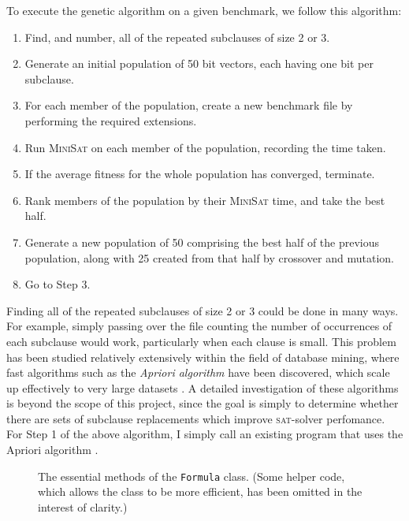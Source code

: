 \documentclass[proof,pdftex,11pt,a4,titlepage]{article}
\def\code{\lstinline[basicstyle=\textsize\ttfamily]}
\newcommand{\sat}{\textsc{sat}}
\begin{document}
To execute the genetic algorithm on a given benchmark, we follow this algorithm:

\begin{samepage}
  \begin{enumerate}
    \item Find, and number, all of the repeated subclauses of size 2 or 3.
    \item Generate an initial population of 50 bit vectors, each having one bit per subclause.
    \item For each member of the population, create a new benchmark file by performing the required extensions.
    \item Run \textsc{MiniSat} on each member of the population, recording the time taken.
    \item If the average fitness for the whole population has converged, terminate.
    \item Rank members of the population by their \textsc{MiniSat} time, and take the best half.
    \item Generate a new population of 50 comprising the best half of the previous population, along with 25 created from that half by crossover and mutation.
    \item Go to Step 3.
  \end{enumerate}
\end{samepage}

Finding all of the repeated subclauses of size 2 or 3 could be done in many ways. For example, simply passing over the file counting the number of occurrences of each subclause would work, particularly when each clause is small. This problem has been studied relatively extensively within the field of database mining, where fast algorithms such as the \emph{Apriori algorithm} have been discovered, which scale up effectively to very large datasets \cite{Agrawal:1994}. A detailed investigation of these algorithms is beyond the scope of this project, since the goal is simply to determine whether there are sets of subclause replacements which improve \sat{}-solver perfomance. For Step 1 of the above algorithm, I simply call an existing program that uses the Apriori algorithm \cite{Borgelt:2003}.

\begin{figure}[p]
  
  \caption{The essential methods of the \code{Formula} class. (Some helper code, which allows the class to be more efficient, has been omitted in the interest of clarity.)}
  \label{fig:formula-class}
\end{figure}
\end{document}
